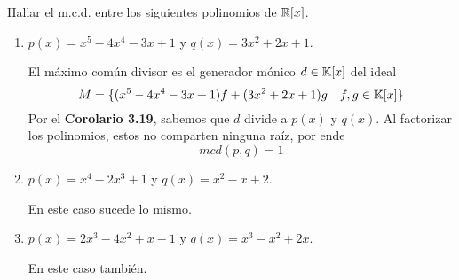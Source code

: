 \item Hallar el m.c.d. entre los siguientes polinomios de $\mathbb{R}[x]$.
    \begin{enumerate}
        \item $p(x)=x^5-4x^4-3x+1$ y $q(x)=3x^2+2x+1$.
            \begin{mdframed}[style=s]
                El máximo común divisor es el generador mónico $d\in\mathbb{K}[x]$ del ideal\[M=\{(x^5-4x^4-3x+1)f+(3x^2+2x+1)g\quad f,g\in\mathbb{K}[x]\}\]
                Por el \textbf{Corolario 3.19}, sabemos que $d$ divide a $p(x)$ y $q(x)$. Al factorizar los polinomios, estos no comparten ninguna raíz, por ende\[mcd(p,q)=1\]
            \end{mdframed}
        \item $p(x)=x^4-2x^3+1$ y $q(x)=x^2-x+2$.
            \begin{mdframed}[style=s]
                En este caso sucede lo mismo.
            \end{mdframed}
        \item $p(x)=2x^3-4x^2+x-1$ y $q(x)=x^3-x^2+2x$.
            \begin{mdframed}[style=s]
                En este caso también.
            \end{mdframed}
    \end{enumerate}